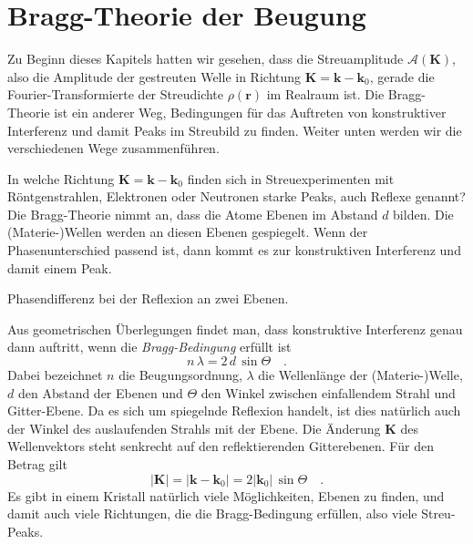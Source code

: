 \section{Bragg-Theorie der Beugung}

Zu Beginn dieses Kapitels hatten wir gesehen, dass die Streuamplitude $\mathcal{A}(\mathbf{K})$, also die Amplitude der gestreuten Welle in Richtung $\mathbf{K} = \mathbf{k} - \mathbf{k}_0$, gerade die Fourier-Transformierte der Streudichte $\rho(\mathbf{r})$ im Realraum ist. Die Bragg-Theorie ist ein anderer Weg, Bedingungen für das Auftreten von konstruktiver Interferenz und damit Peaks im Streubild zu finden. Weiter unten werden wir die verschiedenen Wege zusammenführen.

In welche Richtung $\mathbf{K} = \mathbf{k} - \mathbf{k}_0$ finden sich in Streuexperimenten mit Röntgenstrahlen, Elektronen oder Neutronen starke Peaks, auch Reflexe genannt? Die Bragg-Theorie nimmt an, dass die Atome Ebenen im Abstand $d$ bilden. Die (Materie-)Wellen werden an diesen Ebenen gespiegelt. Wenn der Phasenunterschied passend ist, dann kommt es zur konstruktiven Interferenz und damit einem Peak.


\begin{marginfigure}

\caption{Phasendifferenz bei der Reflexion an zwei Ebenen.}
\end{marginfigure}


Aus geometrischen Überlegungen findet man, dass konstruktive Interferenz genau dann auftritt, wenn die \emph{Bragg-Bedingung} erfüllt ist
\begin{equation}
n \, \lambda = 2 \, d \, \sin \Theta \quad .
\end{equation}
Dabei bezeichnet $n$ die Beugungsordnung, $\lambda$ die Wellenlänge der (Materie-)Welle, $d$ den Abstand der Ebenen und $\Theta$ den Winkel zwischen einfallendem Strahl und Gitter-Ebene. Da es sich um spiegelnde Reflexion handelt, ist dies natürlich auch der Winkel des auslaufenden Strahls mit der Ebene. Die Änderung 
$\mathbf{K}$ des Wellenvektors  steht senkrecht auf den reflektierenden Gitterebenen. Für den  Betrag gilt
\begin{equation}
|\mathbf{K}| = |\mathbf{k} - \mathbf{k}_0| = 2 | \mathbf{k}_0| \, \sin \Theta \quad .
\label{eq:rezi_def_k_sin_theta}
\end{equation}
Es gibt in einem Kristall natürlich viele Möglichkeiten, Ebenen zu finden, und damit auch viele Richtungen, die die Bragg-Bedingung erfüllen, also viele Streu-Peaks.
 
